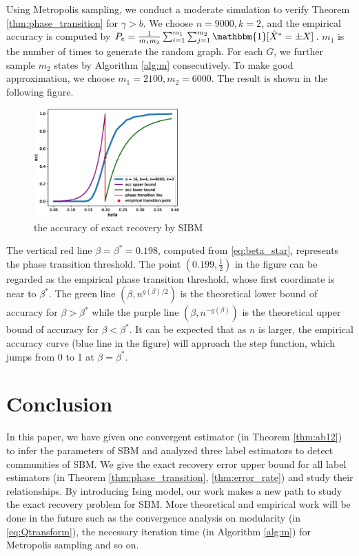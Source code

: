 \documentclass[entropy,article,submit,moreauthors,pdftex]{Definitions/mdpi}
\newcommand{\1}{\mathbbm{1}}
\begin{document}
Using Metropolis sampling, we conduct a moderate simulation to verify Theorem \ref{thm:phase_transition} for $\gamma > b$.
We choose $n=9000, k=2$, and the empirical accuracy is computed by $P_e = \frac{1}{m_1m_2}\sum_{i=1}^{m_1} \sum_{j=1}^{m_2} \mathbbm{1}[\hat{X}^* = \pm X]$. $m_1$ is the number of times to generate the random graph. For each $G$, we further sample $m_2$ states by Algorithm \ref{alg:m} consecutively.
To make good approximation, we choose $m_1=2100,m_2=6000$.
The result is shown in the following figure.
\begin{figure}[!ht]
		\centering
	\includegraphics[width=0.5\textwidth]{beta_trans-2020-11-28.eps}
	\caption{the accuracy of exact recovery by SIBM}
\end{figure}

The vertical red line $\beta=\beta^* = 0.198$, computed from \eqref{eq:beta_star}, represents the phase transition threshold. The point $(0.199,\frac{1}{2})$ in the figure
can be regarded as the empirical phase transition threshold, whose first coordinate is near to $\beta^*$.
The green line $(\beta, n^{g(\beta)/2})$ is the theoretical lower bound of accuracy for $\beta>\beta^*$ while the purple line
$(\beta, n^{-g(\beta)})$ is the theoretical upper bound of accuracy for $\beta < \beta^*$. It can be expected that
as $n$ is larger, the empirical accuracy curve (blue line in the figure) will approach the step function, which jumps from
0 to 1 at $\beta=\beta^*$.
\section{Conclusion}
In this paper, we have given one convergent estimator (in Theorem \ref{thm:ab12}) to infer the parameters of SBM and analyzed three label estimators to detect communities of SBM.
We give the exact recovery error upper bound for all label estimators (in Theorem \ref{thm:phase_transition}, \ref{thm:error_rate})
and study their relationships. By introducing Ising model, our work makes a new path to study the exact recovery problem for SBM. More
theoretical and empirical work will be done in the future such as the convergence analysis on modularity (in \eqref{eq:Qtransform}), the necessary iteration time (in Algorithm \ref{alg:m}) for Metropolis sampling and so on.
\end{document}

